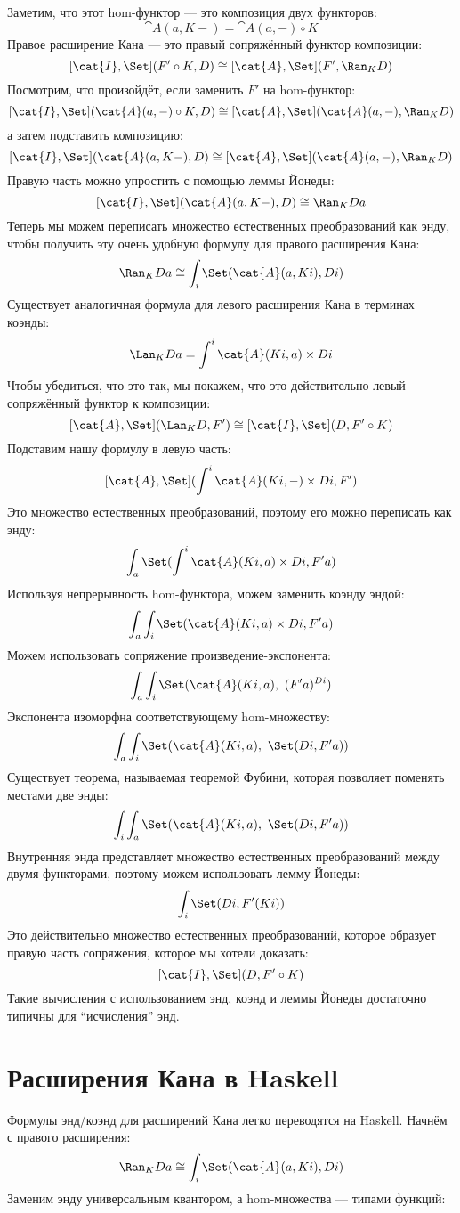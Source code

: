 \noindent
Заметим, что этот hom-функтор — это композиция двух функторов:
\[\cat{A}(a, K -) = \cat{A}(a, -) \circ K\]
Правое расширение Кана — это правый сопряжённый функтор композиции:
\[[\cat{I}, \Set](F' \circ K, D) \cong [\cat{A}, \Set](F', \Ran_{K}D)\]
Посмотрим, что произойдёт, если заменить $F'$ на hom-функтор:
\[[\cat{I}, \Set](\cat{A}(a, -) \circ K, D) \cong [\cat{A}, \Set](\cat{A}(a, -), \Ran_{K}D)\]
а затем подставить композицию:
\[[\cat{I}, \Set](\cat{A}(a, K -), D) \cong [\cat{A}, \Set](\cat{A}(a, -), \Ran_{K}D)\]
Правую часть можно упростить с помощью леммы Йонеды:
\[[\cat{I}, \Set](\cat{A}(a, K -), D) \cong \Ran_{K}D a\]
Теперь мы можем переписать множество естественных преобразований как энду, чтобы получить
эту очень удобную формулу для правого расширения Кана:
\[\Ran_{K}D a \cong \int_i \Set(\cat{A}(a, K i), D i)\]
Существует аналогичная формула для левого расширения Кана в терминах
коэнды:
\[\Lan_{K}D a = \int^i \cat{A}(K i, a)\times{}D i\]
Чтобы убедиться, что это так, мы покажем, что это действительно левый
сопряжённый функтор к композиции:
\[[\cat{A}, \Set](\Lan_{K}D, F') \cong [\cat{I}, \Set](D, F' \circ K)\]
Подставим нашу формулу в левую часть:
\[[\cat{A}, \Set](\int^i \cat{A}(K i, -)\times{}D i, F')\]
Это множество естественных преобразований, поэтому его можно переписать как
энду:
\[\int_a \Set(\int^i \cat{A}(K i, a)\times{}D i, F' a)\]
Используя непрерывность hom-функтора, можем заменить коэнду
эндой:
\[\int_a \int_i \Set(\cat{A}(K i, a)\times{}D i, F' a)\]
Можем использовать сопряжение произведение-экспонента:
\[\int_a \int_i \Set(\cat{A}(K i, a),\ (F' a)^{D i})\]
Экспонента изоморфна соответствующему hom-множеству:
\[\int_a \int_i \Set(\cat{A}(K i, a),\ \Set(D i, F' a))\]
Существует теорема, называемая теоремой Фубини, которая позволяет поменять местами
две энды:
\[\int_i \int_a \Set(\cat{A}(K i, a),\ \Set(D i, F' a))\]
Внутренняя энда представляет множество естественных преобразований между двумя
функторами, поэтому можем использовать лемму Йонеды:
\[\int_i \Set(D i, F' (K i))\]
Это действительно множество естественных преобразований, которое образует правую
часть сопряжения, которое мы хотели доказать:
\[[\cat{I}, \Set](D, F' \circ K)\]
Такие вычисления с использованием энд, коэнд и леммы Йонеды
достаточно типичны для ``исчисления'' энд.

\section{Расширения Кана в Haskell}

Формулы энд/коэнд для расширений Кана легко переводятся на
Haskell. Начнём с правого расширения:
\[\Ran_{K}D a \cong \int_i \Set(\cat{A}(a, K i), D i)\]
Заменим энду универсальным квантором, а hom-множества —
типами функций:

